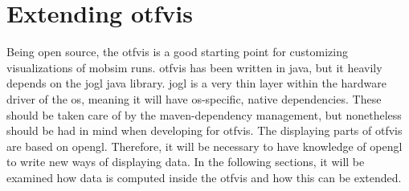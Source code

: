 \section{Extending \gls{otfvis}}
Being open source, the \gls{otfvis} is a good starting point for customizing visualizations of mobsim runs. 
\gls{otfvis} has been written in \gls{java}, but it heavily depends on the \gls{jogl} \gls{java} library.%
\gls{jogl} is a very thin layer within the hardware driver of the \gls{os}, meaning it will have \gls{os}-specific, native dependencies. 
These should be taken care of by the maven-dependency management, but nonetheless should be had in mind when developing for \gls{otfvis}. 
The displaying parts of \gls{otfvis} are based on \gls{opengl}. 
Therefore, it will be necessary to have knowledge of \gls{opengl} to write new ways of displaying data. 
In the following sections, it will be examined how data is computed inside the \gls{otfvis} and how this can be extended.

